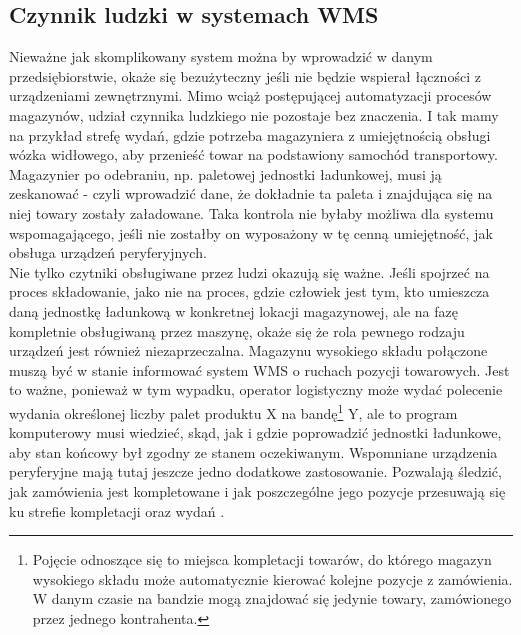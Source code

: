 	\subsection{Czynnik ludzki w systemach WMS}
	Nieważne jak skomplikowany system można by wprowadzić w danym przedsiębiorstwie, okaże się
	bezużyteczny jeśli nie będzie wspierał łączności z urządzeniami zewnętrznymi. Mimo wciąż 
	postępującej automatyzacji procesów magazynów, udział czynnika ludzkiego nie pozostaje bez 
	znaczenia. I tak mamy na przykład strefę wydań, gdzie potrzeba magazyniera z umiejętnością
	obsługi wózka widłowego, aby przenieść towar na podstawiony samochód transportowy. 
	Magazynier po odebraniu, np. paletowej jednostki ładunkowej, musi ją zeskanować - czyli
	wprowadzić dane, że dokładnie ta paleta i znajdująca się na niej towary zostały załadowane.
	Taka kontrola nie byłaby możliwa dla systemu wspomagającego, jeśli nie zostałby on wyposażony
	w tę cenną umiejętność, jak obsługa urządzeń peryferyjnych. \\
	
	Nie tylko czytniki obsługiwane przez ludzi okazują się ważne. Jeśli spojrzeć na proces składowanie,
	jako nie na proces, gdzie człowiek jest tym, kto umieszcza daną jednostkę ładunkową w konkretnej lokacji
	magazynowej, ale na fazę kompletnie obsługiwaną przez maszynę, okaże się że rola pewnego
	rodzaju urządzeń jest również niezaprzeczalna. Magazynu wysokiego składu połączone muszą być w stanie
	informować system WMS o ruchach pozycji towarowych. Jest to ważne, ponieważ w tym wypadku, operator
	logistyczny może wydać polecenie wydania określonej liczby palet produktu X na bandę\footnote{Pojęcie odnoszące
	się to miejsca kompletacji towarów, do którego magazyn wysokiego składu może automatycznie kierować
	kolejne pozycje z zamówienia. W danym czasie na bandzie mogą znajdować się jedynie towary, zamówionego przez
	jednego kontrahenta.} Y, ale to program
	komputerowy musi wiedzieć, skąd, jak i gdzie poprowadzić jednostki ładunkowe, aby stan
	końcowy był zgodny ze stanem oczekiwanym. Wspomniane urządzenia peryferyjne mają tutaj jeszcze jedno
	dodatkowe zastosowanie. Pozwalają śledzić, jak zamówienia jest kompletowane i jak poszczególne
	jego pozycje przesuwają się ku strefie kompletacji oraz wydań \cite{LAJ_ZZ_KWMS}.
	

